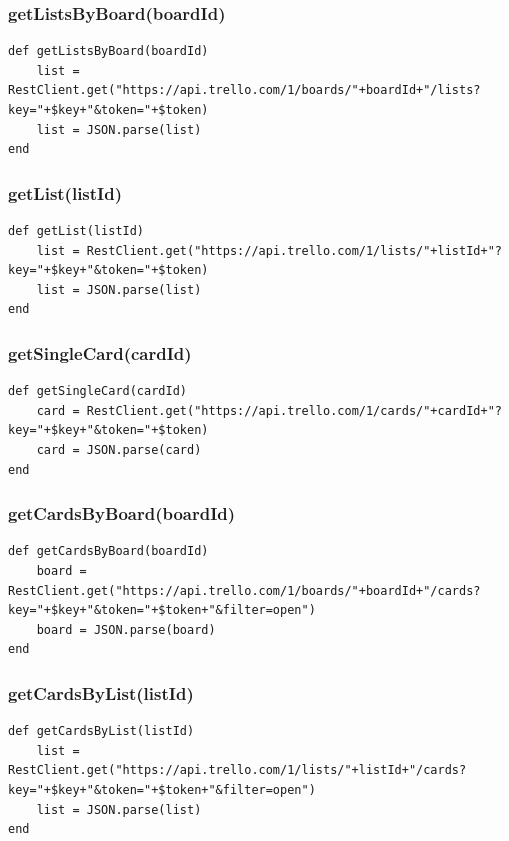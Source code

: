 \subsubsection{getListsByBoard(boardId)}
\begin{lstlisting}[aboveskip=1\baselineskip, caption= getListsByBoard(), label=listing046]
def getListsByBoard(boardId)
	list = RestClient.get("https://api.trello.com/1/boards/"+boardId+"/lists?key="+$key+"&token="+$token)
	list = JSON.parse(list)	
end
\end{lstlisting}

\subsubsection{getList(listId)}
\begin{lstlisting}[aboveskip=1\baselineskip, caption= getList(), label=listing047]
def getList(listId)
	list = RestClient.get("https://api.trello.com/1/lists/"+listId+"?key="+$key+"&token="+$token)
	list = JSON.parse(list)	
end
\end{lstlisting}

\subsubsection{getSingleCard(cardId)}
\begin{lstlisting}[aboveskip=1\baselineskip, caption=getSingleCard(), label=listing048]
def getSingleCard(cardId)
	card = RestClient.get("https://api.trello.com/1/cards/"+cardId+"?key="+$key+"&token="+$token)
	card = JSON.parse(card)
end
\end{lstlisting}

\subsubsection{getCardsByBoard(boardId)}\begin{lstlisting}[aboveskip=1\baselineskip, caption=getCardsByBoard() label=listing049]
def getCardsByBoard(boardId)
	board = RestClient.get("https://api.trello.com/1/boards/"+boardId+"/cards?key="+$key+"&token="+$token+"&filter=open")
	board = JSON.parse(board)
end
\end{lstlisting}

\subsubsection{getCardsByList(listId)}
\begin{lstlisting}[aboveskip=1\baselineskip, caption=getCardsByList(), label=listing050]
def getCardsByList(listId)
	list = RestClient.get("https://api.trello.com/1/lists/"+listId+"/cards?key="+$key+"&token="+$token+"&filter=open")
	list = JSON.parse(list)
end
\end{lstlisting}

